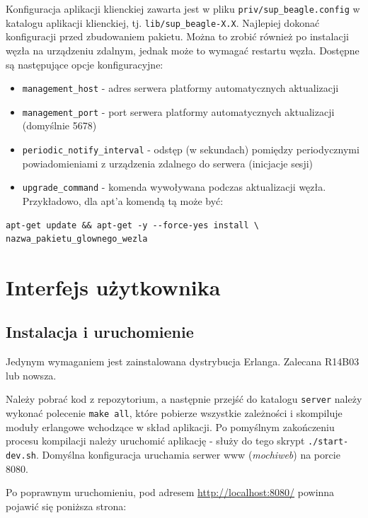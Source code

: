 \documentclass[polish,12pt]{aghthesis}
\begin{document}
Konfiguracja aplikacji klienckiej zawarta jest w pliku \texttt{priv/sup\_beagle.config} w katalogu aplikacji klienckiej, tj. \texttt{lib/sup\_beagle-X.X}. Najlepiej dokonać konfiguracji przed zbudowaniem pakietu. Można to zrobić również po instalacji węzła na urządzeniu zdalnym, jednak może to wymagać restartu węzła. Dostępne są następujące opcje konfiguracyjne:
\begin{itemize}
\item \texttt{management\_host} - adres serwera platformy automatycznych aktualizacji
\item \texttt{management\_port} - port serwera platformy automatycznych aktualizacji (domyślnie 5678)
\item \texttt{periodic\_notify\_interval} - odstęp (w sekundach) pomiędzy periodycznymi powiadomieniami z urządzenia zdalnego do serwera (inicjacje sesji)
\item \texttt{upgrade\_command} - komenda wywoływana podczas aktualizacji węzła. Przykładowo, dla apt'a komendą tą może być:
\end{itemize}

\begin{verbatim}
apt-get update && apt-get -y --force-yes install \
nazwa_pakietu_glownego_wezla
\end{verbatim}

\section{Interfejs użytkownika}
\subsection{Instalacja i uruchomienie}

Jedynym wymaganiem jest zainstalowana dystrybucja Erlanga. Zalecana R14B03 lub nowsza.

Należy pobrać kod z repozytorium, a następnie przejść do katalogu \texttt{server} należy wykonać polecenie \texttt{make all}, które pobierze wszystkie zależności i skompiluje moduły erlangowe wchodzące w skład aplikacji. Po pomyślnym zakończeniu procesu kompilacji należy uruchomić aplikację - służy do tego skrypt \texttt{./start-dev.sh}. Domyślna konfiguracja uruchamia serwer www (\emph{mochiweb}) na porcie 8080.

Po poprawnym uruchomieniu, pod adresem \url{http://localhost:8080/} powinna pojawić się poniższa strona:

\centerline{
}
\end{document}
